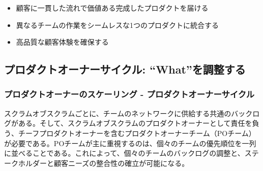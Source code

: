 \documentclass[12pt,a4paper,parskip=full]{scrartcl}
\begin{document}
\begin{itemize}
\itemsep1pt\parskip0pt

\item
顧客に一貫した流れで価値ある完成したプロダクトを届ける
\item
異なるチームの作業をシームレスな1つのプロダクトに統合する
\item
高品質な顧客体験を確保する
\end{itemize}

\subsection{プロダクトオーナーサイクル: “What”を調整する}\label{The-product-owner-cycle}

\subsubsection{プロダクトオーナーのスケーリング - プロダクトオーナーサイクル}\label{Scaling-the-product-owner}

スクラムオブスクラムごとに、チームのネットワークに供給する共通のバックログがある。そして、スクラムオブスクラムのプロダクトオーナーとして責任を負う、チーフプロダクトオーナーを含むプロダクトオーナーチーム（POチーム）が必要である。POチームが主に重視するのは、個々のチームの優先順位を一列に並べることである。これによって、個々のチームのバックログの調整と、ステークホルダーと顧客ニーズの整合性の確立が可能になる。
\end{document}
